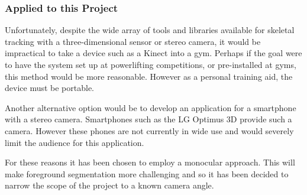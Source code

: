 \subsubsection{Applied to this Project}

Unfortunately, despite the wide array of tools and libraries available for skeletal tracking with a three-dimensional sensor or stereo camera, it would be impractical to take a device such as a Kinect into a gym. Perhaps if the goal were to have the system set up at powerlifting competitions, or pre-installed at gyms, this method would be more reasonable. However as a personal training aid, the device must be portable.

Another alternative option would be to develop an application for a smartphone with a stereo camera. Smartphones such as the LG Optimus 3D\cite{lgoptimus} provide such a camera. However these phones are not currently in wide use and would severely limit the audience for this application.

For these reasons it has been chosen to employ a monocular approach. This will make foreground segmentation more challenging and so it has been decided to narrow the scope of the project to a known camera angle.